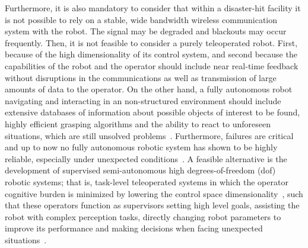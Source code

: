 	Furthermore, it is also mandatory to consider that within a disaster-hit facility it is not possible
	to rely on a stable, wide bandwidth wireless communication system with the robot.
	The signal may be degraded and blackouts may occur frequently.
	Then, it is not feasible to consider a purely teleoperated robot.
	First, because of the high dimensionality of its control system, and second because the capabilities of
	the robot and the operator should include near real-time feedback without disruptions in the communications
	as well as transmission of large amounts of data to the operator.
	On the other hand, a fully autonomous robot navigating and interacting in an non-structured environment
	should include extensive databases of information about possible objects of interest to be found,
	highly efficient grasping algorithms and the ability to react to unforeseen situations,
	which are still unsolved problems~\cite{Romay}.
	Furthermore, failures are critical and up to now no fully autonomous robotic system has shown to be highly
	reliable,	especially under unexpected conditions~\cite{Stormont}.
	A feasible alternative is the development of supervised semi-autonomous high degrees-of-freedom (dof)
	robotic systems; that is, task-level teleoperated systems in which the operator cognitive burden is
	minimized by lowering the control space dimensionality~\cite{Katyal}, such that these operators function
	as supervisors setting high level goals, assisting the robot with complex perception tasks, directly
	changing robot parameters to improve its performance and making decisions when facing unexpected
	situations~\cite{Kohlbrecher}.